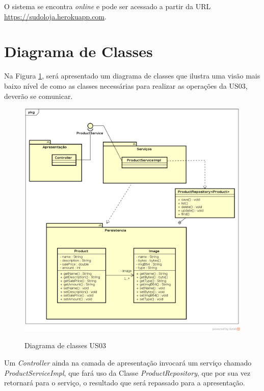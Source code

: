 \documentclass[a4paper,12pt]{monografia}
\begin{document}
O sistema se encontra \textit{online} e pode ser acessado a partir da URL \url{https://sudoloja.herokuapp.com}.



\section{Diagrama de Classes} %
\label{sec:diagrama_de_classes}

Na Figura \ref{fig:diagrama-classe-estoque}, será apresentado um diagrama de classes que ilustra uma visão mais baixo nível de como as classes necessárias para realizar as operações da US03, deverão se comunicar. 

\begin{figure}[H]
\centering
\caption{Diagrama de classes US03}
\centering
\includegraphics[width=15cm]{img/diagramas/class-diagram-estoque.eps}\\
\label{fig:diagrama-classe-estoque}
\end{figure}

Um \textit{Controller} ainda na camada de apresentação invocará um serviço chamado \textit{ProductServiceImpl}, que fará uso da Classe \textit{ProductRepository}, que por sua vez retornará para o serviço, o resultado que será repassado para a apresentação.
\end{document}
